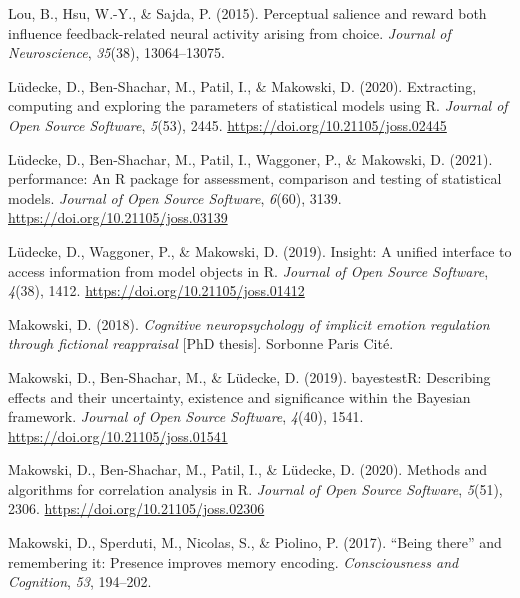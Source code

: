 \documentclass[
  man,floatsintext]{apa6}
\newlength{\cslhangindent}
\newlength{\cslentryspacingunit} %
\newenvironment{CSLReferences}[2] %
 {%
  \setlength{\parindent}{0pt}
  \ifodd #1
  \let\oldpar\par
  \def\par{\hangindent=\cslhangindent\oldpar}
  \fi
  \setlength{\parskip}{#2\cslentryspacingunit}
 }%
 {}
\begin{document}
\begin{CSLReferences}{1}{0}
\leavevmode{}%
Lou, B., Hsu, W.-Y., \& Sajda, P. (2015). Perceptual salience and reward both influence feedback-related neural activity arising from choice. \emph{Journal of Neuroscience}, \emph{35}(38), 13064--13075.

\leavevmode{}%
Lüdecke, D., Ben-Shachar, M., Patil, I., \& Makowski, D. (2020). Extracting, computing and exploring the parameters of statistical models using {R}. \emph{Journal of Open Source Software}, \emph{5}(53), 2445. \url{https://doi.org/10.21105/joss.02445}

\leavevmode{}%
Lüdecke, D., Ben-Shachar, M., Patil, I., Waggoner, P., \& Makowski, D. (2021). {performance}: An {R} package for assessment, comparison and testing of statistical models. \emph{Journal of Open Source Software}, \emph{6}(60), 3139. \url{https://doi.org/10.21105/joss.03139}

\leavevmode{}%
Lüdecke, D., Waggoner, P., \& Makowski, D. (2019). Insight: A unified interface to access information from model objects in {R}. \emph{Journal of Open Source Software}, \emph{4}(38), 1412. \url{https://doi.org/10.21105/joss.01412}

\leavevmode{}%
Makowski, D. (2018). \emph{Cognitive neuropsychology of implicit emotion regulation through fictional reappraisal} {[}PhD thesis{]}. Sorbonne Paris Cit{é}.

\leavevmode{}%
Makowski, D., Ben-Shachar, M., \& Lüdecke, D. (2019). {bayestestR}: Describing effects and their uncertainty, existence and significance within the {Bayesian} framework. \emph{Journal of Open Source Software}, \emph{4}(40), 1541. \url{https://doi.org/10.21105/joss.01541}

\leavevmode{}%
Makowski, D., Ben-Shachar, M., Patil, I., \& Lüdecke, D. (2020). Methods and algorithms for correlation analysis in {R}. \emph{Journal of Open Source Software}, \emph{5}(51), 2306. \url{https://doi.org/10.21105/joss.02306}

\leavevmode{}%
Makowski, D., Sperduti, M., Nicolas, S., \& Piolino, P. (2017). {``Being there''} and remembering it: Presence improves memory encoding. \emph{Consciousness and Cognition}, \emph{53}, 194--202.


\end{CSLReferences}
\end{document}
